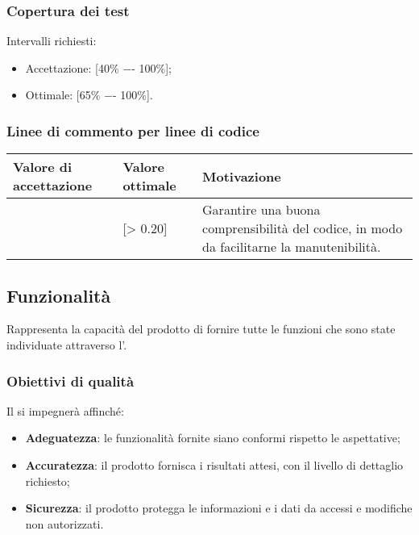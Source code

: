 \subsubsection{Copertura dei test}
Intervalli richiesti:
\begin{itemize}
\item
Accettazione: [40\% −- 100\%];
\item
Ottimale: [65\% −- 100\%].
\end{itemize}

\subsubsection{Linee di commento per linee di codice}

\begin{center}
		\begin{tabular}{|P{2.5cm}|P{2.5cm}|P{6cm}|}
		\hline
			\textbf{Valore di accettazione}	& \textbf{Valore ottimale} & \textbf{Motivazione} \\
			\hline
			[> 0.15] & [> 0.20] &	Garantire una buona comprensibilità del codice, in modo da facilitarne la manutenibilità. \\
			\hline
			\end{tabular}
\end{center}






\subsection{Funzionalità}
Rappresenta la capacità del prodotto di fornire tutte le funzioni che sono state individuate attraverso l'\AdR.

\subsubsection{Obiettivi di qualità}
Il  si impegnerà affinché:
\begin{itemize}
\item \textbf{Adeguatezza}: le funzionalità fornite siano conformi rispetto le aspettative;
\item \textbf{Accuratezza}: il prodotto fornisca i risultati attesi, con il livello di dettaglio richiesto;
\item \textbf{Sicurezza}: il prodotto protegga le informazioni e i dati da accessi e modifiche non autorizzati.
\end{itemize}



